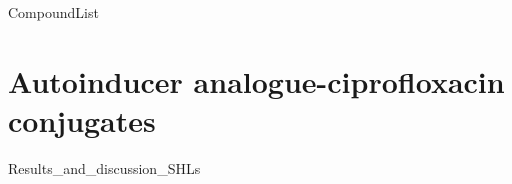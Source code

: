 \documentclass[10pt,a4paper]{article}
\begin{document}

{CompoundList}

\tableofcontents



\section{Autoinducer analogue-ciprofloxacin conjugates}
{Results_and_discussion_SHLs}

\newpage
{}


\listoftodos
\end{document}
